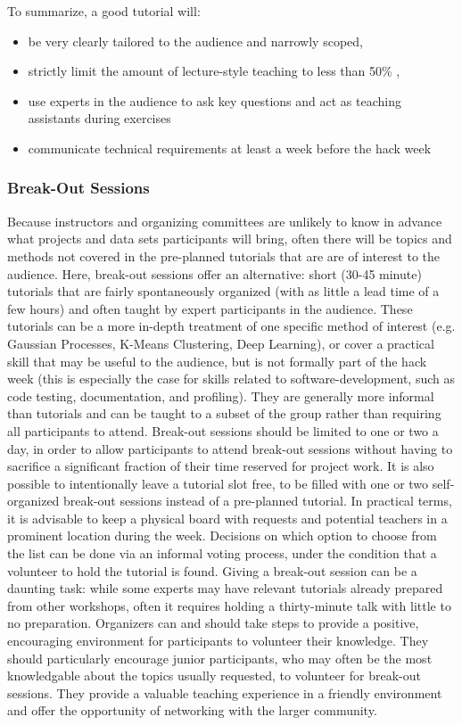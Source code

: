 \documentclass{aastex62}
\begin{document}
To summarize, a good tutorial will:
\begin{itemize}
\item be very clearly tailored to the audience and narrowly scoped,
\item strictly limit the amount of lecture-style teaching to less than 50\% ,
\item use experts in the audience to ask key questions and act as teaching assistants during exercises
\item communicate technical requirements at least a week before the hack week
\end{itemize}

\subsubsection{Break-Out Sessions}

Because instructors and organizing committees are unlikely to know in advance what projects and data sets participants will bring, often there will be topics and methods not covered in the pre-planned tutorials that are are of interest to the audience. Here, break-out sessions offer an alternative: short (30-45 minute) tutorials that are fairly spontaneously organized (with as little a lead time of a few hours) and often taught by expert participants in the audience. These tutorials can be a more in-depth treatment of one specific method of interest (e.g. Gaussian Processes, K-Means Clustering, Deep Learning), or cover a practical skill that may be useful to the audience, but is not formally part of the hack week (this is especially the case for skills related to software-development, such as code testing, documentation, and profiling). They are generally more informal than tutorials and can be taught to a subset of the group rather than requiring all participants to attend.
Break-out sessions should be limited to one or two a day, in order to allow participants to attend break-out sessions without having to sacrifice a significant fraction of their time reserved for project work. It is also possible to intentionally leave a tutorial slot free, to be filled with one or two self-organized break-out sessions instead of a pre-planned tutorial. In practical terms, it is advisable to keep a physical board with requests and potential teachers in a prominent location during the week. Decisions on which option to choose from the list can be done via an informal voting process, under the condition that a volunteer to hold the tutorial is found. Giving a break-out session can be a daunting task: while some experts may have relevant tutorials already prepared from other workshops, often it requires holding a thirty-minute talk with little to no preparation. Organizers can and should take steps to provide a positive, encouraging environment for participants to volunteer their knowledge. They should particularly encourage junior participants, who may often be the most knowledgable about the topics usually requested, to volunteer for break-out sessions. They provide a valuable teaching experience in a friendly environment and offer the opportunity of networking with the larger community.
\end{document}

